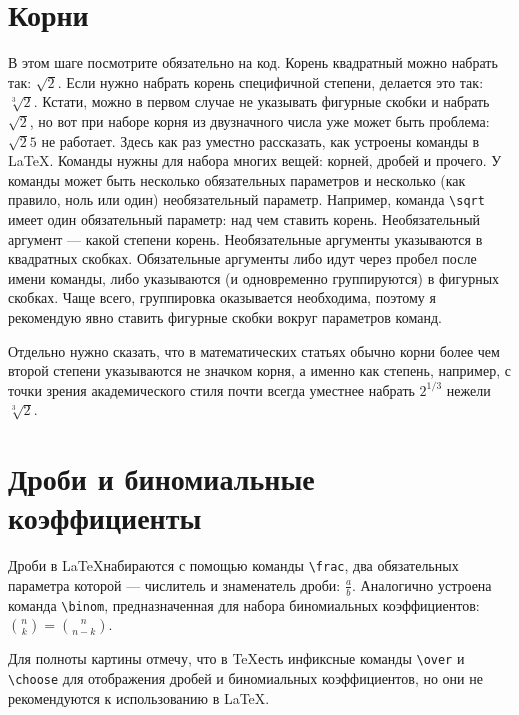\section{Корни}
\par В этом шаге посмотрите обязательно на код. Корень квадратный можно набрать так: \( \sqrt{2} \). Если нужно набрать корень специфичной степени, делается это так: \( \sqrt[3]{2} \). Кстати, можно в первом случае не указывать фигурные скобки и набрать \( \sqrt 2 \), но вот при наборе корня из двузначного числа уже может быть проблема: \( \sqrt 25 \) не работает. Здесь как раз уместно рассказать, как устроены команды в \LaTeX. Команды нужны для набора многих вещей: корней, дробей и прочего. У команды может быть несколько обязательных параметров и несколько (как правило, ноль или один) необязательный параметр. Например, команда \verb"\sqrt" имеет один обязательный параметр: над чем ставить корень. Необязательный аргумент --- какой степени корень. Необязательные аргументы указываются в квадратных скобках. Обязательные аргументы либо идут через пробел после имени команды, либо указываются (и одновременно группируются) в фигурных скобках. Чаще всего, группировка оказывается необходима, поэтому я рекомендую явно ставить фигурные скобки вокруг параметров команд.
\par Отдельно нужно сказать, что в математических статьях обычно корни более чем второй степени указываются не значком корня, а именно как степень, например, с точки зрения академического стиля почти всегда уместнее набрать \( 2^{1/3} \) нежели \( \sqrt[3]{2} \).

\section{Дроби и биномиальные коэффициенты}
\par Дроби в \LaTeX набираются с помощью команды \verb"\frac", два обязательных параметра которой --- числитель и знаменатель дроби: \( \frac{a}{b} \). Аналогично устроена команда \verb"\binom", предназначенная для набора биномиальных коэффициентов: \( \binom{n}{k} = \binom{n}{n-k} \).
\par Для полноты картины отмечу, что в \TeX есть инфиксные команды \verb"\over" и \verb"\choose" для отображения дробей и биномиальных коэффициентов, но они не рекомендуются к использованию в \LaTeX.

